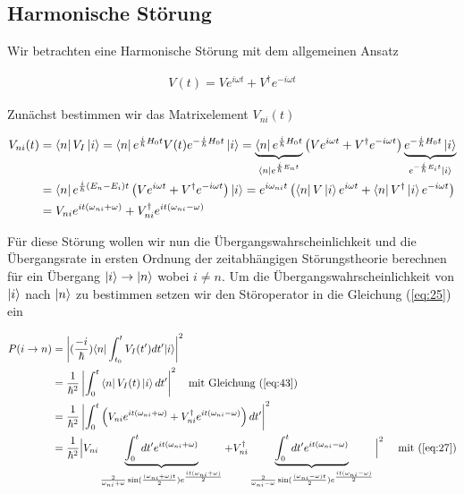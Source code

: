 \subsection{Harmonische Störung}

Wir betrachten eine Harmonische Störung mit dem allgemeinen Ansatz

\begin{align}
  \label{eq:41}
  V(t) = Ve^{i\omega t} + V^\dagger e^{-i\omega t}
\end{align}

Zunächst bestimmen wir das Matrixelement \(V_{ni}(t)\)

\begin{align}
  \label{eq:43}
   V_{ni}(t) &= \bra{n} V_I \ket{i} = \bra{n}e^{\frac{i}{\hbar}H_0 t}V(t) e^{ -\frac{i}{\hbar}H_0 t } \ket{i} = \underbr{\bra{n}e^{\frac{i}{\hbar}H_0 t}}_{\bra{n}e^{\frac{i}{\hbar}E_n t}} \left(Ve^{i\omega t} + V^\dagger e^{-i\omega t}\right) \underbr{ e^{ -\frac{i}{\hbar}H_0 t } \ket{i}}_{e^{ -\frac{i}{\hbar}E_i t } \ket{i}} \notag \\
 & = \bra{n}e^{\frac{i}{\hbar}(E_n-E_i) t} \left(Ve^{i\omega t} + V^\dagger e^{-i\omega t}\right) \ket{i} =  e^{i\omega_{ni} t} \left(\bra{n}V\ket{i} e^{i\omega t} +\bra{n} V^\dagger\ket{i} e^{-i\omega t}\right) \notag \\
 &=  V_{ni} e^{it(\omega_{ni}+\omega) }+ V^\dagger_{ni} e^{it(\omega_{ni}-\omega) }
\end{align}

Für diese Störung wollen wir nun die Übergangswahrscheinlichkeit und die Übergangsrate in ersten Ordnung der zeitabhängigen Störungstheorie berechnen für ein Übergang \(\left| i \right\rangle\to\left| n \right\rangle\) wobei \(i\ne n\). Um die Übergangswahrscheinlichkeit von \(\left| i \right\rangle\) nach \(\left| n \right\rangle\) zu bestimmen setzen wir den Störoperator in die Gleichung (\ref{eq:25}) ein

\begin{align}
  \label{eq:42}
 P(i\rightarrow n) &= \left|(\frac{-i}{\hbar})\langle n |\int_{t_0}^t V_I(t')dt'|i\rangle\right|^2 \notag \\
&= \frac{1}{\hbar^2}\left| \int_{0}^t \left\langle n \right|  V_I(t) \left| i \right\rangle dt'\right|^2  \quad \text{mit Gleichung (\ref{eq:43})} \notag\\
&= \frac{1}{\hbar^2}\left| \int_{0}^t \left( V_{ni} e^{it(\omega_{ni}+\omega) }+ V^\dagger_{ni} e^{it(\omega_{ni}-\omega)} \right)  dt'\right|^2 \notag\\
&= \frac{1}{\hbar^2}  \Big|V_{ni}\underbrace{\int_{0}^t dt' e^{it(\omega_{ni}+\omega) }}_{  \frac{2}{\omega_{ni}+\omega}\sin(\frac{(\omega_{ni}+\omega) t}{2})e^{\frac{it(\omega_{ni}+\omega)}{2}}  }+ V^\dagger_{ni}\underbrace{ \int_{0}^t dt'  e^{it(\omega_{ni}-\omega)}}_{ \frac{2}{\omega_{ni}-\omega}\sin(\frac{(\omega_{ni}-\omega) t}{2})e^{\frac{it(\omega_{ni}-\omega)}{2}} }\Big|^2 \quad \text{ mit (\ref{eq:27})}\notag\\
\end{align}






